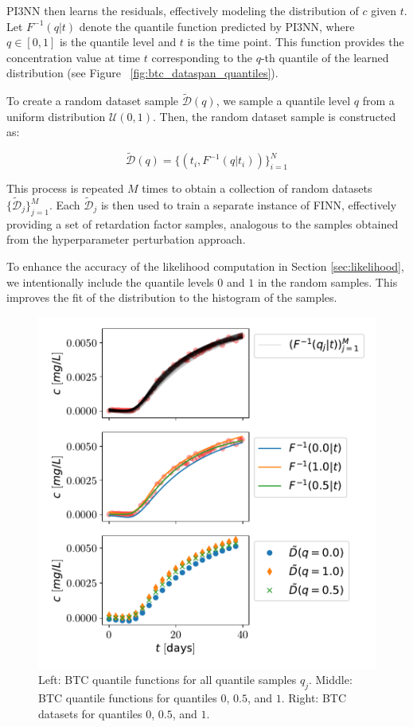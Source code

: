 PI3NN then learns the residuals, effectively modeling the distribution of $c$ given $t$. Let $F^{-1}(q | t)$ denote the quantile function predicted by PI3NN, where $q \in [0, 1]$ is the quantile level and $t$ is the time point. This function provides the concentration value at time $t$ corresponding to the $q$-th quantile of the learned distribution (see Figure ~\vref{fig:btc_dataspan_quantiles}).

To create a random dataset sample $\tilde{\mathcal{D}}(q)$, we sample a quantile level $q$ from a uniform distribution $\mathcal{U}(0, 1)$. Then, the random dataset sample is constructed as:

$$
\tilde{\mathcal{D}}(q) = \{ (t_i, F^{-1}(q | t_i) ) \}_{i=1}^N
$$

This process is repeated $M$ times to obtain a collection of random datasets $\{\tilde{\mathcal{D}}_j\}_{j=1}^M$. Each $\tilde{\mathcal{D}}_j$ is then used to train a separate instance of FINN, effectively providing a set of retardation factor samples, analogous to the samples obtained from the hyperparameter perturbation approach.

To enhance the accuracy of the likelihood computation in Section \vref{sec:likelihood}, we intentionally include the quantile levels $0$ and $1$ in the random samples. This improves the fit of the distribution to the histogram of the samples.

\begin{figure}[h]
    \centering
    \includegraphics{figs/btc_dataspan_quantiles.pdf}
    \caption{Left: BTC quantile functions for all quantile samples $q_j$. Middle: BTC quantile functions for quantiles $0$, $0.5$, and $1$. Right: BTC datasets for quantiles $0$, $0.5$, and $1$.}
    \label{fig:btc_dataspan_quantiles}
\end{figure}




